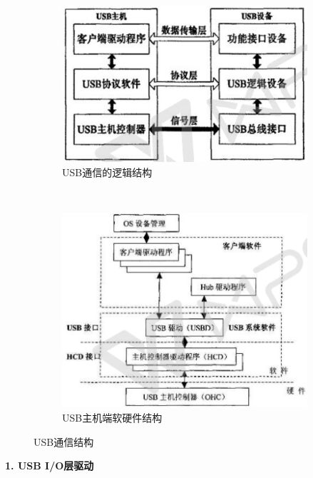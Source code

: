 \begin{figure}[h]
\centering
  \begin{subfigure}[b]{0.4\textwidth}
  \includegraphics[width=1.0\textwidth]{./graphics/USB-device-structure-diagram.pdf}
  \caption{USB通信的逻辑结构}\label{fig:usb通信逻辑结构}
  \end{subfigure}
  ~
  \begin{subfigure}[b]{0.5\textwidth}
  \includegraphics[width=1.0\textwidth]{./graphics/USB-PC-structure.pdf}
  \caption{USB主机端软硬件结构}\label{fig:usb-PC}
  \end{subfigure}
\caption{USB通信结构}\label{fig:USB通信结构}
\end{figure}


\noindent \textbf{1. USB I/O层驱动}

